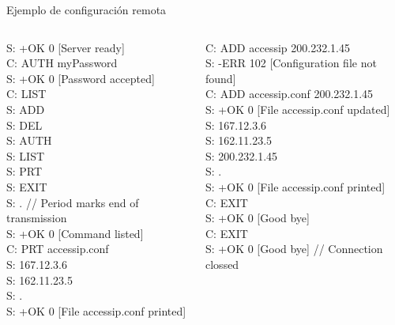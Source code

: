 \documentclass{beamer}
\begin{document}
\begin{frame}{Ejemplo de configuración remota}
\begin{columns}
\begin{column}{5cm}
\begin{block}{}
\scriptsize
S: +OK 0 [Server ready]\\
C: AUTH myPassword\\
S: +OK 0 [Password accepted]\\
C: LIST\\
S: ADD\\
S: DEL\\
S: AUTH\\
S: LIST\\
S: PRT\\
S: EXIT\\
S: .  // Period marks end of transmission\\
S: +OK 0 [Command listed]\\
C: PRT access\textunderscore ip.conf\\
S: 167.12.3.6\\
S: 162.11.23.5\\
S: .\\
S: +OK 0 [File access\textunderscore ip.conf printed]\\
\end{block}
\end{column}
\begin{column}{5cm}
\begin{block}{}
\scriptsize
C: ADD access\textunderscore ip 200.232.1.45\\
S: -ERR 102 [Configuration file not found]\\
C: ADD access\textunderscore ip.conf 200.232.1.45\\
S: +OK 0 [File access\textunderscore ip.conf updated]\\
S: 167.12.3.6\\
S: 162.11.23.5\\
S: 200.232.1.45\\
S: .\\
S: +OK 0 [File access\textunderscore ip.conf printed]\\
C: EXIT\\
S: +OK 0 [Good bye]\\
C: EXIT\\
S: +OK 0 [Good bye] // Connection clossed\\
\end{block}
\end{column}
\end{columns}
\end{frame}
\end{document}
